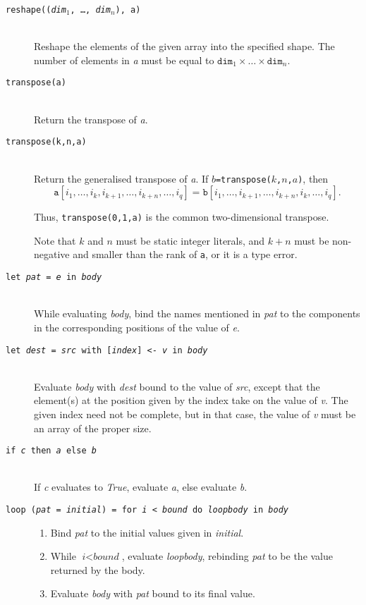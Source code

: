 \begin{description}
  \item[\texttt{reshape((\textit{dim}$_{1}$, \ldots, \textit{dim}$_{n}$), a)}]\hfill\\
    Reshape the elements of the given array into the specified shape.
    The number of elements in \textit{a} must be equal to
    $\texttt{dim}_{1}\times\ldots\times\texttt{dim}_{n}$.

  \item[\texttt{transpose(a)}]\hfill\\
    Return the transpose of \textit{a}.

  \item[\texttt{transpose(k,n,a)}]\hfill\\
    Return the generalised transpose of \textit{a}.  If
    \texttt{$b$=transpose($k$,$n$,$a$)}, then
    \[
    \texttt{a}[i_1, \ldots, i_k, i_{k+1}, \ldots, i_{k+n}, \ldots, i_q ]
    =
    \texttt{b}[i_1 , \ldots, i_{k+1} , \ldots, i_{k+n}, i_k, \ldots, i_q ].
    \]

    Thus, \texttt{transpose(0,1,a)} is the common two-dimensional
    transpose.

    Note that $k$ and $n$ must be static integer literals, and $k+n$
    must be non-negative and smaller than the rank of \texttt{a}, or
    it is a type error.

  \item[\texttt{let \textit{pat} = \textit{e} in \textit{body}}]\hfill\\
    While evaluating \textit{body}, bind the names mentioned in
    \textit{pat} to the components in the corresponding positions of
    the value of \textit{e}.

  \item[\texttt{let \textit{dest} = \textit{src} with [\textit{index}] <- \textit{v} in \textit{body}}] \hfill \\
    Evaluate \textit{body} with \textit{dest} bound to the value of
    \textit{src}, except that the element(s) at the position given by
    the index take on the value of \textit{v}.  The given index need
    not be complete, but in that case, the value of \textit{v} must be
    an array of the proper size.

  \item[\texttt{if \textit{c} then \textit{a} else \textit{b}}]\hfill\\
    If \textit{c} evaluates to \textit{True}, evaluate \textit{a},
    else evaluate \textit{b}.

  \item[\texttt{loop (\textit{pat} = \textit{initial}) = for \textit{i} < \textit{bound} do \textit{loopbody} in \textit{body}}]\hfill
    \begin{enumerate}
    \item Bind \textit{pat} to the initial values given in \textit{initial}.
    \item While $\textit{i} < \textit{bound}$, evaluate \textit{loopbody},
      rebinding \textit{pat} to be the value returned by the body.
    \item Evaluate \textit{body} with \textit{pat} bound to its final
      value.
    \end{enumerate}


\end{description}
